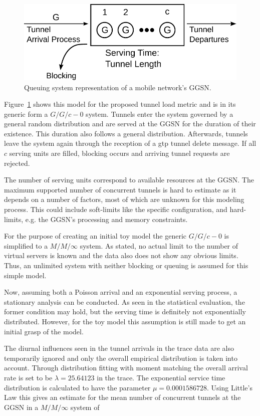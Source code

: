 \begin{figure}[htb]
	\centering
	\includegraphics[width=\textwidth]{images/GGn-model.pdf}
	\caption{Queuing system representation of a mobile network's \gls{GGSN}.}
\label{c4:fig:ggn-model}
\end{figure}


Figure~\ref{c4:fig:ggn-model} shows this model for the proposed tunnel load metric and is in its generic form a $G/G/c-0$ system. Tunnels enter the system governed by a general random distribution and are served at the \gls{GGSN} for the duration of their existence. This duration also follows a general distribution. Afterwards, tunnels leave the system again through the reception of a \gls{gtp} tunnel delete message. If all $c$ serving units are filled, blocking occurs and arriving tunnel requests are rejected.

The number of serving units correspond to available resources at the \gls{GGSN}. The maximum supported number of concurrent tunnels is hard to estimate as it depends on a number of factors, most of which are unknown for this modeling process. This could include soft-limits like the specific configuration, and hard-limits, e.g. the \gls{GGSN}'s processing and memory constraints. 

For the purpose of creating an initial toy model the generic $G/G/c-0$ is simplified to a $M/M/\infty$ system. As stated, no actual limit to the number of virtual servers is known and the data also does not show any obvious limits. Thus, an unlimited system with neither blocking or queuing is assumed for this simple model.

Now, assuming both a Poisson arrival and an exponential serving process, a stationary analysis can be conducted. As seen in the statistical evaluation, the former condition may hold, but the serving time is definitely not exponentially distributed. However, for the toy model this assumption is still made to get an initial grasp of the model.

The diurnal influences seen in the tunnel arrivals in the trace data are also temporarily ignored and only the overall empirical distribution is taken into account. Through distribution fitting with moment matching the overall arrival rate is set to be $\lambda=25.64123$ in the trace. The exponential service time distribution is calculated to have the parameter $\mu=0.0001586728$. Using Little's Law this gives an estimate for the mean number of concurrent tunnels at the \gls{GGSN} in a $M/M/\infty$ system of 

